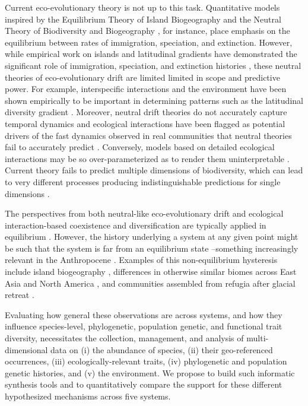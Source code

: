 \documentclass[11pt]{article}
\begin{document}
Current eco-evolutionary theory is not up to this task. Quantitative
models inspired by the Equilibrium Theory of Island Biogeography
\cite{MacArthur1967-ux} and the Neutral Theory of Biodiversity and
Biogeography \cite{Hubbell2001-dx}, for instance, place emphasis on
the equilibrium between rates of immigration, speciation, and
extinction. However, while empirical work on islands and latitudinal
gradients have demonstrated the significant role of immigration,
speciation, and extinction histories \cite{Gillespie2004-zv,
  Owens2017-ja}, these neutral theories of eco-evolutionary drift are
limited limited in scope and predictive power. For example,
interspecific interactions and the environment have been shown
empirically to be important in determining patterns such as the
latitudinal diversity gradient
\cite{Janzen1967-fk,Mittelbach2007-ui,Pianka1966-ky}. Moreover,
neutral drift theories do not accurately capture temporal dynamics
\cite{Ricklefs2006-tn, Chisholm2014-mu} and ecological interactions
have been flagged as potential drivers of the fast dynamics observed
in real communities that neutral theories fail to accurately predict
\cite{Rosindell2015-gp,Ricklefs2006-tn}. Conversely, models based on
detailed ecological interactions may be so over-parameterized as to
render them uninterpretable \cite{Rosindell2012-pm}. Current theory
fails to predict multiple dimensions of biodiversity, which can lead
to very different processes producing indistinguishable predictions
for single dimensions
\cite{Chisholm2010-yg,McGill2003-sf,McGill2007-zd,Leibold2017-jv}.

The perspectives from both neutral-like eco-evolutionary drift and
ecological interaction-based coexistence and diversification are
typically applied in equilibrium
\cite{Rominger_undated-cw,Etienne2007-we,Chesson2000-uc,Hubbell2001-dx}.
However, the history underlying a system at any given point might be
such that the system is far from an equilibrium state --something
increasingly relevant in the Anthropocene \cite{Barnosky2012-qz}.
Examples of this non-equilibrium hysteresis include island biogeography
\cite{Ricklefs2001-af}, differences in otherwise similar biomes across
East Asia and North America \cite{Qian2005-co,Yu2017-cc}, and
communities assembled from refugia after glacial retreat
\cite{Carnaval2008-og,Carnaval2009-vd,Burbrink2016-nu}.

Evaluating how general these observations are across systems, and how
they influence species-level, phylogenetic, population genetic, and
functional trait diversity, necessitates the collection, management, and
analysis of multi-dimensional data on (i) the abundance of species, (ii)
their geo-referenced occurrences, (iii) ecologically-relevant traits, (iv)
phylogenetic and population genetic histories, and (v) the environment.
We propose to build such informatic synthesis tools and to
quantitatively compare the support for these different hypothesized
mechanisms across five systems.
\end{document}
